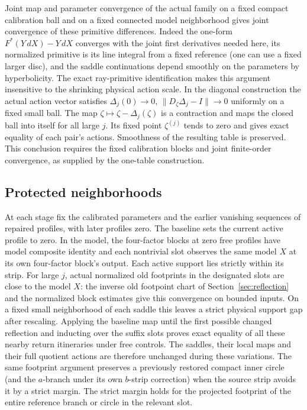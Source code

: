 \documentclass[11pt]{article}
\begin{document}
Joint map and parameter convergence of the actual family on a fixed compact
calibration ball and on a fixed connected model neighborhood gives joint
convergence of these primitive differences. Indeed the one-form
\(F^*(Y\,dX)-Y\,dX\) converges with the joint first derivatives needed here, its
normalized primitive is its line integral from a fixed reference (one can use a
fixed larger disc), and the saddle continuations depend smoothly on the
parameters by hyperbolicity. The exact ray-primitive identification makes this
argument insensitive to the shrinking physical action scale. In the diagonal
construction the actual action vector satisfies \(\Delta_j(0)\to0\),
\(\|D_\zeta\Delta_j-I\|\to0\) uniformly on a fixed small ball. The map
\(\zeta\mapsto\zeta-\Delta_j(\zeta)\) is a contraction and maps the closed ball into itself
for all large \(j\). Its fixed point \(\zeta^{(j)}\) tends to zero and gives exact
equality of each pair's actions. Smoothness of the resulting table is preserved.
This conclusion requires the fixed calibration blocks and joint finite-order
convergence, as supplied by the one-table construction.

\subsection{Protected neighborhoods}\label{protected-neighborhoods}

At each stage fix the calibrated parameters and the earlier
vanishing sequences of repaired profiles, with later profiles zero.
The baseline sets the current active profile to zero. In the model,
the four-factor blocks at zero free profiles have model composite
identity and each nontrivial slot observes the same model \(X\) at its own
four-factor block's output. Each active support lies strictly within its strip.
For large \(j\), actual normalized old footprints in the designated slots are
close to the model \(X\): the inverse old footpoint chart of
Section~\ref{sec:reflection} and the normalized block estimates
give this convergence on bounded inputs. On a fixed small neighborhood of each
saddle this leaves a strict physical support gap after rescaling. Applying the baseline map until the first possible changed reflection and inducting over the
suffix slots proves exact equality of all these nearby return itineraries under
free controls. The saddles, their local maps and their full quotient actions are
therefore unchanged during these variations. The same footprint argument
preserves a previously restored compact inner circle (and the \(a\)-branch under
its own \(b\)-strip correction) when the source strip avoids it by a strict
margin. The strict margin holds for the projected footprint of the entire
reference branch or circle in the relevant slot.
\end{document}
